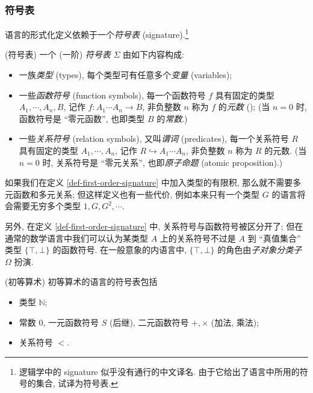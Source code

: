 \subsubsection{符号表}

语言的形式化定义依赖于一个\emph{符号表} (signature).\footnote{逻辑学中的 signature 似乎没有通行的中文译名. 由于它给出了语言中所用的符号的集合, 试译为符号表.}

\begin{definition}
	[label={def-first-order-signature}]
	{(符号表)}
	一个 (一阶) \emph{符号表} $\Sigma$ 由如下内容构成:
	\begin{itemize}
		\item 一族\emph{类型} (types),
		每个类型可有任意多个\emph{变量} (variables)\footnotemark;
		\item 一些\emph{函数符号} (function symbols),
		每一个函数符号 $f$ 具有固定的类型 $A_1,\cdots,A_n,B$, 记作 $f \colon A_1\cdots A_n \to B$, 非负整数 $n$ 称为 $f$ 的\emph{元数} (); (当 $n=0$ 时, 函数符号是 ``零元函数'', 也即类型 $B$ 的\emph{常数}.)
		\item 一些\emph{关系符号} (relation symbols), 又叫\emph{谓词} (predicates),
		每一个关系符号 $R$ 具有固定的类型 $A_1,\cdots,A_n$, 记作 $R \hookrightarrow A_1\cdots A_n$, 非负整数 $n$ 称为 $R$ 的元数. (当 $n=0$ 时, 关系符号是 ``零元关系'', 也即\emph{原子命题} (atomic proposition).)
	\end{itemize}
\end{definition}

\begin{remark}{}
	如果我们在定义 \ref{def-first-order-signature} 中加入类型的有限积, 那么就不需要多元函数和多元关系; 但这样定义也有一些代价, 例如本来只有一个类型 $G$ 的语言将会需要无穷多个类型 $1,G,G^2,\cdots$.
	
	另外, 在定义 \ref{def-first-order-signature} 中, 关系符号与函数符号被区分开了; 但在通常的数学语言中我们可以认为某类型 $A$ 上的关系符号不过是 $A$ 到 ``真值集合'' 类型 $\{\top,\bot\}$ 的函数符号. 在一般意象的内语言中, $\{\top,\bot\}$ 的角色由\emph{子对象分类子} $\Omega$ 扮演.
\end{remark}

\begin{example}
	[label={natural-numbers-language}]
	{(初等算术)}
	初等算术的语言的符号表包括
	\begin{itemize}
		\item 类型 $\mathbb{N}$;
		\item 常数 $0$, 一元函数符号 $S$ (后继), 二元函数符号 $+,\times$ (加法, 乘法);
		\item 关系符号 $<$.
	\end{itemize}
\end{example}

